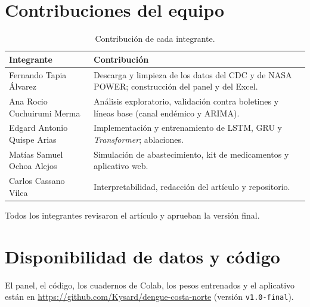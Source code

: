 \documentclass[conference,a4paper]{IEEEtran}
\newcommand{\repo}{\url{https://github.com/Kysard/dengue-costa-norte}}
\begin{document}
\section*{Contribuciones del equipo}
\begin{table}[h]
\centering
\caption{Contribución de cada integrante.}\label{tab:contrib}
\setlength{\tabcolsep}{3pt}\footnotesize
\begin{tabular}{>{\raggedright\arraybackslash}p{2.5cm}>{\raggedright\arraybackslash}p{5.4cm}}
\toprule
Integrante & Contribución \\
\midrule
Fernando Tapia Álvarez & Descarga y limpieza de los datos del CDC y de NASA POWER; construcción del panel y del Excel. \\
Ana Rocio Cuchuirumi Merma & Análisis exploratorio, validación contra boletines y líneas base (canal endémico y ARIMA). \\
Edgard Antonio Quispe Arias & Implementación y entrenamiento de LSTM, GRU y \textit{Transformer}; ablaciones. \\
Matías Samuel Ochoa Alejos & Simulación de abastecimiento, kit de medicamentos y aplicativo web. \\
Carlos Cassano Vilca & Interpretabilidad, redacción del artículo y repositorio. \\
\bottomrule
\end{tabular}
\end{table}
Todos los integrantes revisaron el artículo y aprueban la versión final.

\section*{Disponibilidad de datos y código}
El panel, el código, los cuadernos de Colab, los pesos entrenados y el aplicativo están en \repo{} (versión \texttt{v1.0-final}).



\end{document}
